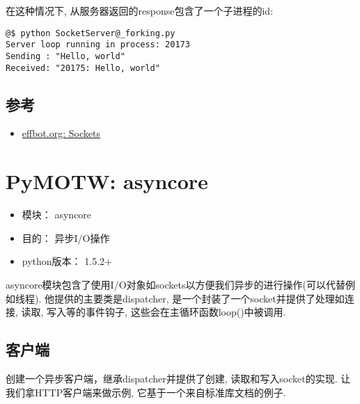 \documentclass[a4paper,10pt,english]{manual}
\begin{document}
在这种情况下, 从服务器返回的response包含了一个子进程的id:

\begin{Verbatim}[commandchars=@\[\]]
@$ python SocketServer@_forking.py
Server loop running in process: 20173
Sending : "Hello, world"
Received: "20175: Hello, world"
\end{Verbatim}


\section{参考}
\begin{itemize}
\item {} 
\href{http://effbot.org/zone/socket-intro.htm}{effbot.org: Sockets}

\end{itemize}

\resetcurrentobjects


\chapter{PyMOTW: asyncore}
\begin{itemize}
\item {} 
模块： asyncore

\item {} 
目的： 异步I/O操作

\item {} 
python版本： 1.5.2+

\end{itemize}

asyncore模块包含了使用I/O对象如sockets以方便我们异步的进行操作(可以代替例如线程). 他提供的主要类是dispatcher, 是一个封装了一个socket并提供了处理如连接, 读取, 写入等的事件钩子, 这些会在主循环函数loop()中被调用.


\section{客户端}

创建一个异步客户端，继承dispatcher并提供了创建, 读取和写入socket的实现. 让我们拿HTTP客户端来做示例, 它基于一个来自标准库文档的例子.
\end{document}
